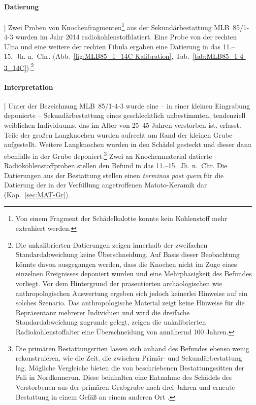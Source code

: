 \paragraph{Datierung}\hspace{-.5em}|\hspace{.5em}%
Zwei Proben von Knochenfragmenten\footnote{Von einem Fragment der Schädelkalotte konnte kein Kohlenstoff mehr extrahiert werden.} aus der Sekundärbestattung MLB~85/1-4-3 wurden im Jahr 2014 radiokohlenstoffdatiert. Eine Probe von der rechten Ulna und eine weitere der rechten Fibula ergaben eine Datierung in das 11.--15.~Jh. n.~Chr. (Abb.~\ref{fig:MLB85_1_14C-Kalibration}, Tab.~\ref{tab:MLB85_1-4-3_14C}).\footnote{Die unkalibrierten Datierungen zeigen innerhalb der zweifachen Standardabweichung keine Überschneidung. Auf Basis dieser Beobachtung könnte davon ausgegangen werden, dass die Knochen nicht im Zuge eines einzelnen Ereignisses deponiert wurden und eine Mehrphasigkeit des Befundes vorliegt. Vor dem Hintergrund der präsentierten archäologischen wie anthropologischen Auswertung ergeben sich jedoch keinerlei Hinweise auf ein solches Szenario. Das anthropologische Material zeigt keine Hinweise für die Repräsentanz mehrerer Individuen und wird die dreifache Standardabweichung zugrunde gelegt, zeigen die unkalibrierten Radiokohlenstoffalter eine Überschneidung von annähernd 100 Jahren.}  

\paragraph{Interpretation}\hspace{-.5em}|\hspace{.5em}%
Unter der Bezeichnung MLB~85/1-4-3 wurde eine -- in einer kleinen Eingrabung deponierte -- Sekundärbestattung eines geschlechtlich unbestimmten, tendenziell weiblichen Individuums, das im Alter von 25--45 Jahren verstorben ist, erfasst. Teile der großen Langknochen wurden aufrecht am Rand der kleinen Grube aufgestellt. Weitere Langknochen wurden in den Schädel gesteckt und dieser dann ebenfalls in der Grube deponiert.\footnote{Die primären Bestattungsriten lassen sich anhand des Befundes ebenso wenig rekonstruieren, wie die Zeit, die zwischen Primär- und Sekundärbestattung lag. Mögliche Vergleiche bieten die von \textcite[266--268]{Wotzka.1993} beschriebenen Bestattungssitten der Fali in Nordkamerun. Diese beinhalten eine Entnahme des Schädels des Verstorbenen aus der primären Grabgrube nach drei Jahren und erneute Bestattung in einem Gefäß an einem anderen Ort \parencite[268]{Wotzka.1993}.} Zwei an Knochenmaterial datierte Radiokohlenstoffproben stellen den Befund in das 11.--15.~Jh. n.~Chr. Die Datierungen aus der Bestattung stellen einen \textit{terminus post quem} für die Datierung der in der Verfüllung angetroffenen Matoto-Keramik dar (Kap.~\ref{sec:MAT-Gr}).